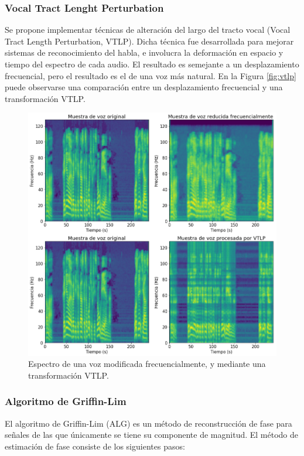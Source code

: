 \subsubsection{Vocal Tract Lenght Perturbation}
Se propone implementar técnicas de alteración del largo del tracto vocal \cite{vtlp} (Vocal Tract Length Perturbation, VTLP). Dicha técnica fue desarrollada para mejorar sistemas de reconocimiento del habla, e involucra la deformación en espacio y tiempo del espectro de cada audio. El resultado es semejante a un desplazamiento frecuencial, pero el resultado es el de una voz más natural. En la Figura \eqref{fig:vtlp} puede observarse una comparación entre un desplazamiento frecuencial y una transformación VTLP.


\begin{figure}[H]
    \centering
    \includegraphics[scale=0.5]{imagenes/vtlp.png}
    \caption{Espectro de una voz modificada frecuencialmente, y mediante una transformación VTLP.}
    \label{fig:vtlp}
\end{figure}

\subsubsection{Algoritmo de Griffin-Lim}
El algoritmo de Griffin-Lim (ALG)\cite{griffin} es un método de reconstrucción de fase para señales de las que únicamente se tiene su componente de magnitud. El método de estimación de fase consiste de los siguientes pasos:

